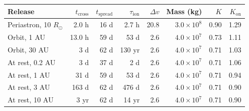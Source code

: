 \begin{tabular}{lrrrrrrr}
\toprule
Release & $t_\mathrm{cross}$ & $t_\mathrm{spread}$ & $\tau_\mathrm{ion}$ & $\Delta v$ & Mass (kg) & $K$ & $K_\mathrm{on}$ \\
\midrule
Periastron, 10 $R_\odot$ & 2.0 h & 16 d & 2.7 h & 20.8 & $3.0\times10^{8}$ & 0.90 & 1.29 \\
Orbit, 1 AU & 13.0 h & 59 d & 53 d & 2.6 & $4.0\times10^{7}$ & 0.73 & 1.11 \\
Orbit, 30 AU & 3 d & 62 d & 130 yr & 2.6 & $4.0\times10^{7}$ & 0.71 & 1.03 \\
At rest, 0.2 AU & 3 d & 37 d & 2 d & 2.6 & $4.0\times10^{7}$ & 0.71 & 1.06 \\
At rest, 1 AU & 31 d & 59 d & 53 d & 2.6 & $4.0\times10^{7}$ & 0.71 & 0.94 \\
At rest, 3 AU & 163 d & 62 d & 476 d & 2.6 & $4.0\times10^{7}$ & 0.71 & 0.90 \\
At rest, 10 AU & 3 yr & 62 d & 14 yr & 2.6 & $4.0\times10^{7}$ & 0.71 & 0.90 \\
\bottomrule
\end{tabular}
